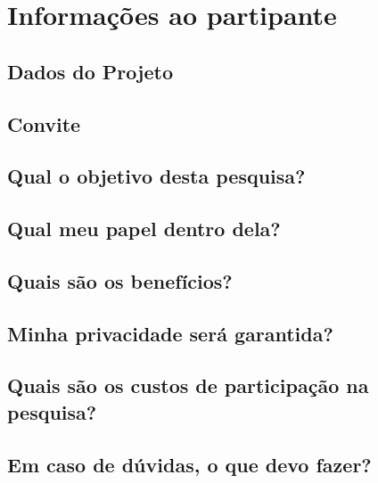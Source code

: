 \chapter{Informações ao partipante}
\label{ape:informacoes-participante}


\section{Dados do Projeto}

\section{Convite}

\section{Qual o objetivo desta pesquisa?}

\section{Qual meu papel dentro dela?}

\section{Quais são os benefícios?}

\section{Minha privacidade será garantida?}

\section{Quais são os custos de participação na pesquisa?}

\section{Em caso de dúvidas, o que devo fazer?}

